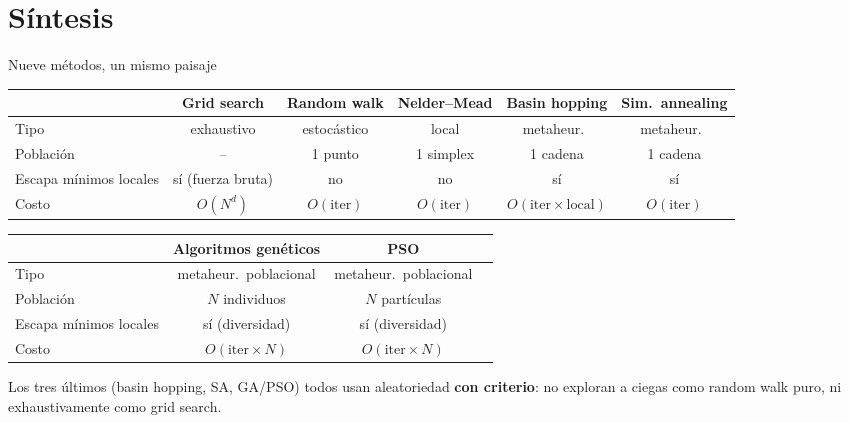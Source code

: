 \documentclass[aspectratio=169,10pt]{beamer}
\begin{document}
\section{Síntesis}

\begin{frame}{Nueve métodos, un mismo paisaje}
  \tiny
  \begin{center}
  \begin{tabular}{lccccc}
    \toprule
    & \textbf{Grid search} & \textbf{Random walk} & \textbf{Nelder--Mead}
      & \textbf{Basin hopping} & \textbf{Sim.\ annealing} \\
    \midrule
    Tipo & exhaustivo & estocástico & local & metaheur.\ & metaheur.\ \\
    Población & -- & 1 punto & 1 simplex & 1 cadena & 1 cadena \\
    Escapa mínimos locales & sí (fuerza bruta) & no & no & sí & sí \\
    Costo & $O(N^d)$ & $O(\text{iter})$ & $O(\text{iter})$ &
      $O(\text{iter}\times\text{local})$ & $O(\text{iter})$ \\
    \bottomrule
  \end{tabular}
  \vspace{4pt}
  \begin{tabular}{lccc}
    \toprule
    & \textbf{Algoritmos genéticos} & \textbf{PSO} & \\
    \midrule
    Tipo & metaheur.\ poblacional & metaheur.\ poblacional & \\
    Población & $N$ individuos & $N$ partículas & \\
    Escapa mínimos locales & sí (diversidad) & sí (diversidad) & \\
    Costo & $O(\text{iter}\times N)$ & $O(\text{iter}\times N)$ & \\
    \bottomrule
  \end{tabular}
  \end{center}
  \normalsize
  \vspace{6pt}
  \small Los tres últimos (basin hopping, SA, GA/PSO) todos usan
  aleatoriedad \textbf{con criterio}: no exploran a ciegas como random
  walk puro, ni exhaustivamente como grid search.
\end{frame}
\end{document}
